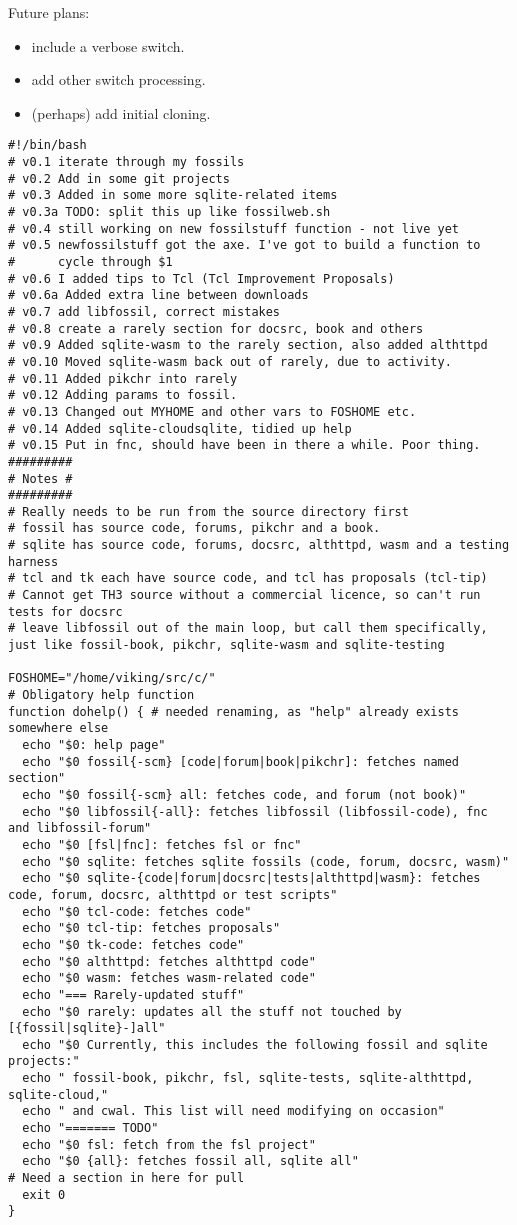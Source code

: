 \documentclass[11pt]{article}
\begin{document}
Future plans: 
\begin{itemize}
\item include a verbose switch.
\item add other switch processing.
\item (perhaps) add initial cloning.
\end{itemize}

\begin{verbatim}
#!/bin/bash
# v0.1 iterate through my fossils
# v0.2 Add in some git projects
# v0.3 Added in some more sqlite-related items
# v0.3a TODO: split this up like fossilweb.sh
# v0.4 still working on new fossilstuff function - not live yet
# v0.5 newfossilstuff got the axe. I've got to build a function to
#      cycle through $1
# v0.6 I added tips to Tcl (Tcl Improvement Proposals)
# v0.6a Added extra line between downloads
# v0.7 add libfossil, correct mistakes
# v0.8 create a rarely section for docsrc, book and others
# v0.9 Added sqlite-wasm to the rarely section, also added althttpd
# v0.10 Moved sqlite-wasm back out of rarely, due to activity.
# v0.11 Added pikchr into rarely
# v0.12 Adding params to fossil.
# v0.13 Changed out MYHOME and other vars to FOSHOME etc.
# v0.14 Added sqlite-cloudsqlite, tidied up help
# v0.15 Put in fnc, should have been in there a while. Poor thing.
#########
# Notes #
#########
# Really needs to be run from the source directory first
# fossil has source code, forums, pikchr and a book.
# sqlite has source code, forums, docsrc, althttpd, wasm and a testing harness
# tcl and tk each have source code, and tcl has proposals (tcl-tip)
# Cannot get TH3 source without a commercial licence, so can't run tests for docsrc
# leave libfossil out of the main loop, but call them specifically, just like fossil-book, pikchr, sqlite-wasm and sqlite-testing

FOSHOME="/home/viking/src/c/"
# Obligatory help function
function dohelp() { # needed renaming, as "help" already exists somewhere else
  echo "$0: help page"
  echo "$0 fossil{-scm} [code|forum|book|pikchr]: fetches named section"
  echo "$0 fossil{-scm} all: fetches code, and forum (not book)"
  echo "$0 libfossil{-all}: fetches libfossil (libfossil-code), fnc and libfossil-forum"
  echo "$0 [fsl|fnc]: fetches fsl or fnc"
  echo "$0 sqlite: fetches sqlite fossils (code, forum, docsrc, wasm)"
  echo "$0 sqlite-{code|forum|docsrc|tests|althttpd|wasm}: fetches code, forum, docsrc, althttpd or test scripts"
  echo "$0 tcl-code: fetches code"
  echo "$0 tcl-tip: fetches proposals"
  echo "$0 tk-code: fetches code"
  echo "$0 althttpd: fetches althttpd code"
  echo "$0 wasm: fetches wasm-related code"
  echo "=== Rarely-updated stuff"
  echo "$0 rarely: updates all the stuff not touched by [{fossil|sqlite}-]all"
  echo "$0 Currently, this includes the following fossil and sqlite projects:"
  echo " fossil-book, pikchr, fsl, sqlite-tests, sqlite-althttpd, sqlite-cloud,"
  echo " and cwal. This list will need modifying on occasion"
  echo "======= TODO"
  echo "$0 fsl: fetch from the fsl project"
  echo "$0 {all}: fetches fossil all, sqlite all"
# Need a section in here for pull
  exit 0
}


\end{verbatim}
\end{document}
